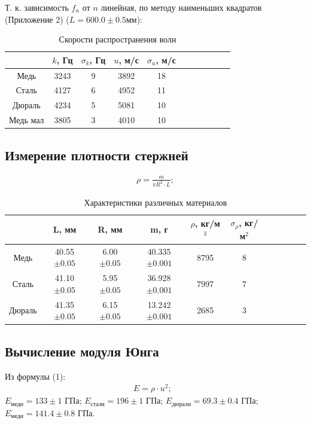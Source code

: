 \documentclass[a4paper]{article}
\begin{document}
Т. к. зависимость $f_n$ от $n$ линейная, по методу наименьших квадратов (Приложение 2) \newline ($L=600.0\pm 0.5 мм$):

\begin{table}[!h]
\caption{Скорости распространения волн} 
\centering
\begin{tabular}{|c|c|c|c|c|c|c|c|c|c|c|}
\hline
& $k $, Гц & $\sigma_k$, Гц & $u$, м/с & $\sigma_u$, м/с \\
\hline
Медь & 3243 & 9 & 3892 & 18 \\
\hline
Сталь & 4127 & 6 & 4952 & 11 \\
\hline
Дюраль & 4234 & 5 & 5081 & 10\\
\hline
Медь мал& 3805 & 3 & 4010 & 10 \\
\hline
\end{tabular}
\end{table} 

\subsection{Измерение плотности стержней}

\[
\begin{gathered}
	\rho = \frac{m}{\pi R^2 \cdot L}; 
\end{gathered}
\]

\begin{table}[!h]
	\caption{Характеристики различных материалов} 
	\centering
	\begin{tabular}{|c|c|c|c|c|c|c|c|c|c|c|}
		\hline
		& L, мм & R, мм & m, г & $\rho$, кг/м$^3$ & $\sigma_{\rho}$, кг/м$^2$\\
		\hline
		Медь & 40.55 $\pm 0.05$ & 6.00 $\pm 0.05$& 40.335 $\pm 0.001$& 8795 & 8\\
		\hline
		Сталь & 41.10 $\pm 0.05$& 5.95 $\pm 0.05$& 36.928 $\pm 0.001$& 7997 & 7\\
		\hline
		Дюраль & 41.35 $\pm 0.05$& 6.15 $\pm 0.05$& 13.242 $\pm 0.001$& 2685 & 3\\
		\hline
	\end{tabular}
\end{table} 
\newpage
\subsection{Вычисление модуля Юнга}
Из формулы (1):
\[
\begin{gathered}
	E = \rho \cdot u^2; \text{ }
\end{gathered}
\]
$E_\text{меди} = 133 \pm 1$ ГПа; $E_\text{стали} = 196 \pm 1$ ГПа; $E_\text{дюрали} = 69.3 \pm 0.4$ ГПа; $E_\text{меди} = 141.4 \pm 0.8$ ГПа.
\end{document}
